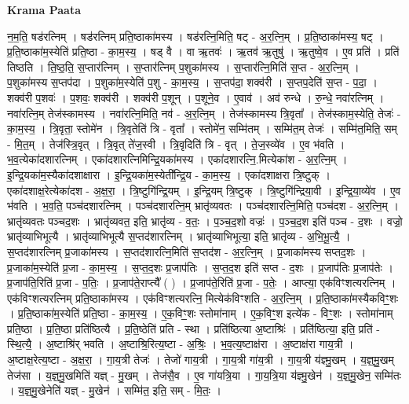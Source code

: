 \documentclass[17pt]{extarticle}
\begin{document}
\textbf{Krama Paata} \newline

न॒म॒ति॒ षड॑रत्निम् । षड॑रत्निम् प्रति॒ष्ठाका॑मस्य । षड॑रत्नि॒मिति॒ षट् - अ॒र॒त्नि॒म् । प्र॒ति॒ष्ठाका॑मस्य॒ षट् । प्र॒ति॒ष्ठाका॑म॒स्येति॑ प्रति॒ष्ठा - का॒म॒स्य॒ । षड् वै । वा ऋ॒तवः॑ । ऋ॒तव॑ ऋ॒तुषु॑ । ऋ॒तुष्वे॒व । ए॒व प्रति॑ । प्रति॑ तिष्ठति । ति॒ष्ठ॒ति॒ स॒प्तार॑त्निम् । स॒प्तार॑त्निम् प॒शुका॑मस्य । स॒प्तार॑त्नि॒मिति॑ स॒प्त - अ॒र॒त्नि॒म् । प॒शुका॑मस्य स॒प्तप॑दा । प॒शुका॑म॒स्येति॑ प॒शु - का॒म॒स्य॒ । स॒प्तप॑दा॒ शक्व॑री । स॒प्तप॒देति॑ स॒प्त - प॒दा॒ । शक्व॑री प॒शवः॑ । प॒शवः॒ शक्व॑री । शक्व॑री प॒शून् । प॒शूने॒व । ए॒वाव॑ । अव॑ रुन्धे । रु॒न्धे॒ नवा॑रत्निम् । नवा॑रत्नि॒म् तेज॑स्कामस्य । नवा॑रत्नि॒मिति॒ नव॑ - अ॒र॒त्नि॒म् । तेज॑स्कामस्य त्रि॒वृता᳚ । तेज॑स्काम॒स्येति॒ तेजः॑ - का॒म॒स्य॒ । त्रि॒वृता॒ स्तोमे॑न । त्रि॒वृतेति॑ त्रि - वृता᳚ । स्तोमे॑न॒ सम्मि॑तम् । सम्मि॑त॒म् तेजः॑ । सम्मि॑त॒मिति॒ सम् - मि॒त॒म् । तेज॑स्त्रि॒वृत् । त्रि॒वृत् ते॑ज॒स्वी । त्रि॒वृदिति॑ त्रि - वृत् । ते॒ज॒स्व्ये॑व । ए॒व भ॑वति । भ॒व॒त्येका॑दशारत्निम् । एका॑दशारत्निमिन्द्रि॒यका॑मस्य । एका॑दशारत्नि॒.मित्येका॑श - अ॒र॒त्नि॒म् । इ॒न्द्रि॒यका॑म॒स्यैका॑दशाक्षारा । इ॒न्द्रि॒यका॑म॒स्येती᳚न्द्रि॒य - का॒म॒स्य॒ । एका॑दशाक्षरा त्रि॒ष्टुक् । एका॑दशाक्ष॒रेत्येका॑दश - अ॒क्ष॒रा॒ । त्रि॒ष्टुगि॑न्द्रि॒यम् । इ॒न्द्रि॒यम् त्रि॒ष्टुक् । त्रि॒ष्टुगि॑न्द्रिया॒वी । इ॒न्द्रि॒या॒व्ये॑व । ए॒व भ॑वति । भ॒व॒ति॒ पञ्च॑दशारत्निम् । पञ्च॑दशारत्नि॒म् भ्रातृ॑व्यवतः । पञ्च॑दशारत्नि॒मिति॒ पञ्च॑दश - अ॒र॒त्नि॒म् । भ्रातृ॑व्यवतः पञ्चद॒शः । भ्रातृ॑व्यवत॒ इति॒ भ्रातृ॑व्य - व॒तः॒ । प॒ञ्च॒द॒शो वज्रः॑ । प॒ञ्च॒द॒श इति॑ पञ्च - द॒शः । वज्रो॒ भ्रातृ॑व्याभिभूत्यै । भ्रातृ॑व्याभिभूत्यै स॒प्तद॑शारत्निम् । भ्रातृ॑व्याभिभूत्या॒ इति॒ भ्रातृ॑व्य - अ॒भि॒भू॒त्यै॒ । स॒प्तद॑शारत्निम् प्र॒जाका॑मस्य । स॒प्तद॑शारत्नि॒मिति॑ स॒प्तद॑श - अ॒र॒त्नि॒म् । प्र॒जाका॑मस्य सप्तद॒शः । प्र॒जाका॑म॒स्येति॑ प्र॒जा - का॒म॒स्य॒ । स॒प्त॒द॒शः प्र॒जाप॑तिः । स॒प्त॒द॒श इति॑ सप्त - द॒शः । प्र॒जाप॑तिः प्र॒जाप॑तेः । प्र॒जाप॑ति॒रिति॑ प्र॒जा - प॒तिः॒ । प्र॒जाप॑ते॒राप्त्यै᳚ ( ) । प्र॒जाप॑ते॒रिति॑ प्र॒जा - प॒तेः॒ । आप्त्या॒ एक॑विꣳशत्यरत्निम् । एक॑विꣳशत्यरत्निम् प्रति॒ष्ठाका॑मस्य । एक॑विꣳशत्यरत्नि॒ मित्येक॑विꣳशति - अ॒र॒त्नि॒म् । प्र॒ति॒ष्ठाका॑मस्यैकविꣳ॒॒शः । प्र॒ति॒ष्ठाका॑म॒स्येति॑ प्रति॒ष्ठा - का॒म॒स्य॒ । ए॒क॒विꣳ॒॒शः स्तोमा॑नाम् । ए॒क॒विꣳ॒॒श इत्ये॑क - विꣳ॒॒शः । स्तोमा॑नाम् प्रति॒ष्ठा । प्र॒ति॒ष्ठा प्रति॑ष्ठित्यै । प्र॒ति॒ष्ठेति॑ प्रति - स्था । प्रति॑ष्ठित्या अ॒ष्टाश्रिः॑ । प्रति॑ष्ठित्या॒ इति॒ प्रति॑ - स्थि॒त्यै॒ । अ॒ष्टाश्रि॑र् भवति । अ॒ष्टाश्रि॒रित्य॒ष्टा - अ॒श्रिः॒ । भ॒व॒त्य॒ष्टाक्ष॑रा । अ॒ष्टाक्ष॑रा गाय॒त्री । अ॒ष्टाक्ष॒रेत्य॒ष्टा - अ॒क्ष॒रा॒ । गा॒य॒त्री तेजः॑ । तेजो॑ गाय॒त्री । गा॒य॒त्री गा॑य॒त्री । गा॒य॒त्री य॑ज्ञ्मु॒खम् । य॒ज्ञ्॒मु॒खम् तेज॑सा । य॒ज्ञ्॒मु॒खमिति॑ यज्ञ् - मु॒खम् । तेज॑सै॒व । ए॒व गा॑यत्रि॒या । गा॒य॒त्रि॒या य॑ज्ञ्मु॒खेन॑ । य॒ज्ञ्॒मु॒खेन॒ सम्मि॑तः । य॒ज्ञ्॒मु॒खेनेति॑ यज्ञ् - मु॒खेन॑ । सम्मि॑त॒ इति॒ सम् - मि॒तः॒ । \newline
\end{document}
